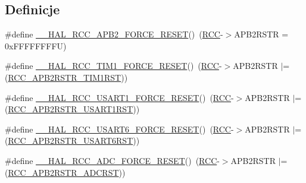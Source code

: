 \subsection*{Definicje}
\begin{DoxyCompactItemize}
\item 
\#define \hyperlink{group___r_c_c___a_p_b2___force___release___reset_ga8788da8c644ad0cc54912baede7d49b4}{\+\_\+\+\_\+\+H\+A\+L\+\_\+\+R\+C\+C\+\_\+\+A\+P\+B2\+\_\+\+F\+O\+R\+C\+E\+\_\+\+R\+E\+S\+ET}()~(\hyperlink{group___peripheral__declaration_ga74944438a086975793d26ae48d5882d4}{R\+CC}-\/$>$A\+P\+B2\+R\+S\+TR = 0x\+F\+F\+F\+F\+F\+F\+F\+F\+U)
\item 
\#define \hyperlink{group___r_c_c___a_p_b2___force___release___reset_gac423d6a52fa42423119844e4a7d68c7b}{\+\_\+\+\_\+\+H\+A\+L\+\_\+\+R\+C\+C\+\_\+\+T\+I\+M1\+\_\+\+F\+O\+R\+C\+E\+\_\+\+R\+E\+S\+ET}()~(\hyperlink{group___peripheral__declaration_ga74944438a086975793d26ae48d5882d4}{R\+CC}-\/$>$A\+P\+B2\+R\+S\+TR $\vert$= (\hyperlink{group___peripheral___registers___bits___definition_ga5bd060cbefaef05487963bbd6c48d7c6}{R\+C\+C\+\_\+\+A\+P\+B2\+R\+S\+T\+R\+\_\+\+T\+I\+M1\+R\+ST}))
\item 
\#define \hyperlink{group___r_c_c___a_p_b2___force___release___reset_ga5db01cf30bf3c5c7fc0b42220f4c70ad}{\+\_\+\+\_\+\+H\+A\+L\+\_\+\+R\+C\+C\+\_\+\+U\+S\+A\+R\+T1\+\_\+\+F\+O\+R\+C\+E\+\_\+\+R\+E\+S\+ET}()~(\hyperlink{group___peripheral__declaration_ga74944438a086975793d26ae48d5882d4}{R\+CC}-\/$>$A\+P\+B2\+R\+S\+TR $\vert$= (\hyperlink{group___peripheral___registers___bits___definition_gae7ae8e338b3b42ad037e9e5b6eeb2c41}{R\+C\+C\+\_\+\+A\+P\+B2\+R\+S\+T\+R\+\_\+\+U\+S\+A\+R\+T1\+R\+ST}))
\item 
\#define \hyperlink{group___r_c_c___a_p_b2___force___release___reset_ga36242e7bdc7abbbdc33c06e72c4b45c7}{\+\_\+\+\_\+\+H\+A\+L\+\_\+\+R\+C\+C\+\_\+\+U\+S\+A\+R\+T6\+\_\+\+F\+O\+R\+C\+E\+\_\+\+R\+E\+S\+ET}()~(\hyperlink{group___peripheral__declaration_ga74944438a086975793d26ae48d5882d4}{R\+CC}-\/$>$A\+P\+B2\+R\+S\+TR $\vert$= (\hyperlink{group___peripheral___registers___bits___definition_gada1df682293e15ed44b081d626220178}{R\+C\+C\+\_\+\+A\+P\+B2\+R\+S\+T\+R\+\_\+\+U\+S\+A\+R\+T6\+R\+ST}))
\item 
\#define \hyperlink{group___r_c_c___a_p_b2___force___release___reset_ga915c2f73eef5fc0e95d76219280ef6c0}{\+\_\+\+\_\+\+H\+A\+L\+\_\+\+R\+C\+C\+\_\+\+A\+D\+C\+\_\+\+F\+O\+R\+C\+E\+\_\+\+R\+E\+S\+ET}()~(\hyperlink{group___peripheral__declaration_ga74944438a086975793d26ae48d5882d4}{R\+CC}-\/$>$A\+P\+B2\+R\+S\+TR $\vert$= (\hyperlink{group___peripheral___registers___bits___definition_ga1374d6eae8e7d02d1ad457b65f374a67}{R\+C\+C\+\_\+\+A\+P\+B2\+R\+S\+T\+R\+\_\+\+A\+D\+C\+R\+ST}))

\end{DoxyCompactItemize}
